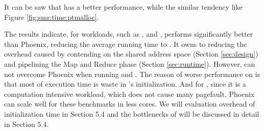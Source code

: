 It can be saw that  has a better performance, while the similar tendency like Figure \ref{fig:smr:time:ptmalloc}.


The results indicate, for workloads, such as ,  and , \myds performs significantly better than Phoenix, reducing the average running time to .
It owns to reducing the overhead caused by contending on the shared address space (Section \ref{sec:design}) and pipelining the Map and Reduce phase (Section \ref{sec:runtime}).
However, \myds can not overcome Phoenix when running  and . 
The reason of worse performance on  is that most of execution time is waste in \myds's initialization.
And for , since it is a computation intensive workload, which does not cause many pagefault, Phoenix can scale well for these benchmarks in less cores.
We will evaluation overhead of initialization time in Section 5.4 and the bottlenecks of \myds will be discussed in detail in Section 5.4. 




